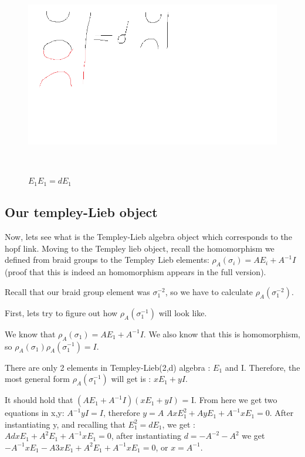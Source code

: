 \documentclass{article}
\begin{document}
\begin{figure}
\includegraphics[scale=0.5]{tempely_lieb_third_rule} 
\caption{$E_{1}E_{1}=dE_{1}$}\
\end{figure}



\subsection{Our templey-Lieb object}
Now, lets see what is the Templey-Lieb algebra object which corresponds to the hopf link.
Moving to the Templey lieb object, recall the homomorphism we defined from braid groups to the Templey Lieb elements:
$\rho_{A}(\sigma_{i}) = AE_{i} +A^{-1}I$
(proof that this is indeed an homomorphism appears in the full version).

Recall that our braid group element was  $\sigma_{1}^{-2}$, so we have to calculate $\rho_{A}(\sigma_{1}^{-2})$.

First, lets try to figure out how $\rho_{A}(\sigma_{1}^{-1})$ will look like.


We know that $\rho_{A}(\sigma_{1}) = AE_{1} +A^{-1}I$. We also know that this is homomorphism, so  $\rho_{A}(\sigma_{1})\rho_{A}(\sigma_{1}^{-1}) = I$.

There are only 2 elements in Templey-Lieb(2,d) algebra : $E_{1}$ and I. Therefore, the most general form $\rho_{A}(\sigma_{1}^{-1})$ will get is :
$xE_{1} + yI$.

It should hold that $( AE_{1} +A^{-1}I)(xE_{1} + yI)$ = I.
From here we get two equations in x,y:
$ A^{-1}yI = I$, therefore $y=A$
$AxE_{1}^{2}+AyE_{1} + A^{-1}xE_{1} = 0$. After instantiating y, and recalling that $E_1^{2} = dE_{1}$, we get :  
$AdxE_{1}+A^{2}E_{1} + A^{-1}xE_{1} = 0$, after instantiating $d=-A^{-2} -A^{2}$ we get 
$-A^{-1}xE_{1} - A{3}xE_{1} +A^{2}E_{1} + A^{-1}xE_{1} = 0$, or $x=A^{-1}$.
\end{document}

